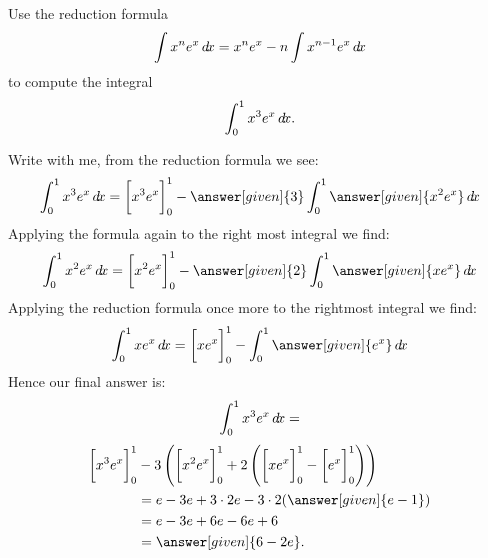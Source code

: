 \documentclass{ximera}
\begin{document}
\begin{example}
  Use the reduction formula
  \[
  \int x^n e^x \mathop{}\!d\! x = x^n e^x -n \int x^{n-1} e^x\mathop{}\!d\! x
  \]
  to compute the integral
  \[
  \int_0^1 x^3 e^x \mathop{}\!d\! x.
  \]
  \begin{explanation}
    Write with me, from the reduction formula we see:
    \[
    \int_0^1 x^3 e^x \d x = \eval{x^3e^x}_0^1 - \answer[given]{3}\int_0^1 \answer[given]{x^{2} e^x}\d x
    \]
    Applying the formula again to the right most integral we find:
    \[
    \int_0^1 x^{2} e^x\d x = \eval{x^2e^x}_0^1 - \answer[given]{2}\int_0^1 \answer[given]{x e^x}\d x
    \]
    Applying the reduction formula once more to the rightmost integral we find:
    \[
    \int_0^1 x e^x\d x = \eval{xe^x}_0^1 - \int_0^1 \answer[given]{e^x}\d x
    \]
    Hence our final answer is:
    \[
    \int_0^1 x^3 e^x \mathop{}\!d\! x =
    \]
    \begin{align*}
      \eval{x^3e^x}_0^1 &- 3\left(\eval{x^2e^x}_0^1 +  2\left(\eval{xe^x}_0^1 -\eval{e^x}_0^1\right)\right)\\
      &= e - 3e + 3\cdot 2 e -3\cdot 2(\answer[given]{e-1})\\
      &= e-3e+6e-6e+6\\
      &=\answer[given]{6-2e}.
    \end{align*}
  \end{explanation}
\end{example}
\end{document}
